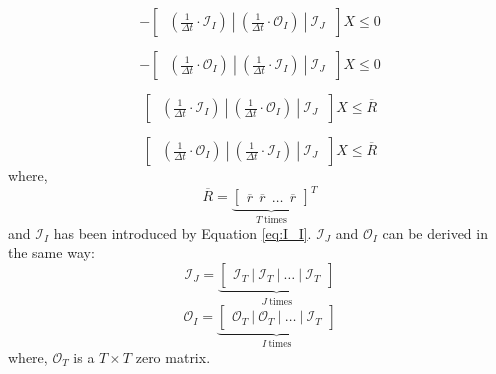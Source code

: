 \begin{equation}
- \begin{bmatrix}
~\left(\frac{1}{\Delta t} \cdot \mathcal{I}_I\right) ~|~ \left(\frac{1}{\Delta t} \cdot \mathcal{O}_I\right)~|~ \mathcal{I}_J~
\end{bmatrix} X \leq 0
\end{equation}

\begin{equation}
-\begin{bmatrix}
~\left(\frac{1}{\Delta t} \cdot \mathcal{O}_I\right) ~|~ \left(\frac{1}{\Delta t} \cdot \mathcal{I}_I\right)~|~\mathcal{I}_J~
\end{bmatrix} X \leq 0
\end{equation}

\begin{equation}
\label{constraint:ESS-capacity}
\begin{bmatrix}
~\left(\frac{1}{\Delta t} \cdot \mathcal{I}_I\right) ~|~ \left(\frac{1}{\Delta t} \cdot \mathcal{O}_I\right)~|~ \mathcal{I}_J~
\end{bmatrix}X \leq \overline{R}
\end{equation}

\begin{equation}
\label{constraint:ESS-capacity-2}
\begin{bmatrix}
~\left(\frac{1}{\Delta t} \cdot \mathcal{O}_I\right) ~|~ \left(\frac{1}{\Delta t} \cdot \mathcal{I}_I\right)~|~\mathcal{I}_J~
\end{bmatrix}X \leq \overline{R}
\end{equation}
where, 
\begin{equation*}
\overline{R} = {\underbrace{\begin{bmatrix}
		\overline{r}~~\overline{r}~~ \dots~~\overline{r}
		\end{bmatrix}}_{T~\text{times}}}^T
\end{equation*}
and $\mathcal{I}_I$ has been introduced by Equation \eqref{eq:I_I}. $\mathcal{I}_J$ and $\mathcal{O}_I$ can be derived in the same way:
\begin{equation*}
\mathcal{I}_J = {\underbrace{\begin{bmatrix}
		\mathcal{I}_T ~|~\mathcal{I}_T ~|~ \dots~|~\mathcal{I}_T 
		\end{bmatrix}}_{J~\text{times}}}
\end{equation*}
\begin{equation*}
\mathcal{O}_I = {\underbrace{\begin{bmatrix}
		\mathcal{O}_T ~|~\mathcal{O}_T ~|~ \dots~|~\mathcal{I}_T 
		\end{bmatrix}}_{I~\text{times}}}
\end{equation*}
where, $\mathcal{O}_T$ is a $T \times T$ zero matrix.

